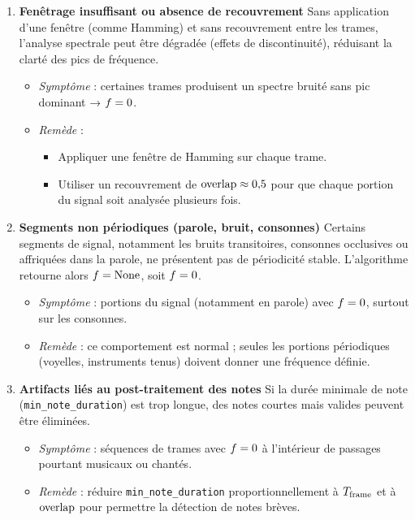 \begin{enumerate}
  \item \textbf{Fenêtrage insuffisant ou absence de recouvrement}  
    Sans application d’une fenêtre (comme Hamming) et sans recouvrement entre les trames, l’analyse spectrale peut être dégradée (effets de discontinuité), réduisant la clarté des pics de fréquence.  
    \begin{itemize}
      \item \emph{Symptôme} : certaines trames produisent un spectre bruité sans pic dominant → \(f = 0\).  
      \item \emph{Remède} :  
        \begin{itemize}
          \item Appliquer une fenêtre de Hamming sur chaque trame.  
          \item Utiliser un recouvrement de \(\mathrm{overlap} \approx 0{,}5\) pour que chaque portion du signal soit analysée plusieurs fois.  
        \end{itemize}
    \end{itemize}

  \item \textbf{Segments non périodiques (parole, bruit, consonnes)}  
    Certains segments de signal, notamment les bruits transitoires, consonnes occlusives ou affriquées dans la parole, ne présentent pas de périodicité stable. L’algorithme retourne alors \(f = \text{None}\), soit \(f = 0\).  
    \begin{itemize}
      \item \emph{Symptôme} : portions du signal (notamment en parole) avec \(f = 0\), surtout sur les consonnes.  
      \item \emph{Remède} : ce comportement est normal ; seules les portions périodiques (voyelles, instruments tenus) doivent donner une fréquence définie.  
    \end{itemize}

  \item \textbf{Artifacts liés au post-traitement des notes}  
    Si la durée minimale de note (\texttt{min\_note\_duration}) est trop longue, des notes courtes mais valides peuvent être éliminées.  
    \begin{itemize}
      \item \emph{Symptôme} : séquences de trames avec \(f = 0\) à l’intérieur de passages pourtant musicaux ou chantés.  
      \item \emph{Remède} : réduire \texttt{min\_note\_duration} proportionnellement à \(T_\mathrm{frame}\) et à \(\mathrm{overlap}\) pour permettre la détection de notes brèves.  
    \end{itemize}
\end{enumerate}

